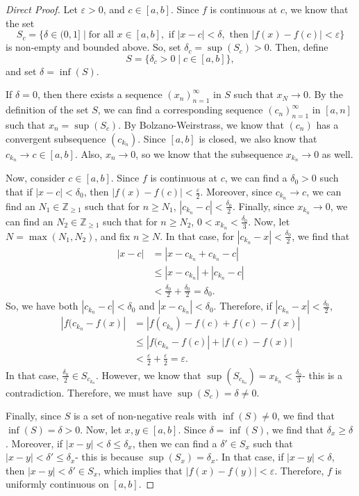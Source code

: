 \documentclass[a4paper, openany]{memoir}
\theoremstyle{definition}
\theoremstyle{plain}
\begin{document}
\begin{proof}[Direct Proof]
Let $\varepsilon > 0$, and $c \in [a, b]$. Since $f$ is continuous at $c$, we know that the set
\[S_c = \{\delta \in (0, 1] \mid \text{for all } x \in [a, b], \text{ if } |x-c| < \delta, \text{ then } |f(x) - f(c)| < \varepsilon\}\]
is non-empty and bounded above. So, set $\delta_c = \sup (S_c) > 0$. Then, define
\[S = \{\delta_c > 0 \mid c \in [a, b]\},\]
and set $\delta = \inf (S)$.

\noindent If $\delta = 0$, then there exists a sequence $(x_n)_{n=1}^{\infty}$ in $S$ such that $x_N \to 0$. By the definition of the set $S$, we can find a corresponding sequence $(c_n)_{n=1}^{\infty}$ in $[a, n]$ such that $x_n = \sup (S_c)$. By Bolzano-Weirstrass, we know that $(c_n)$ has a convergent subsequence $(c_{k_n})$. Since $[a, b]$ is closed, we also know that $c_{k_n} \to c \in [a, b]$. Also, $x_n \to 0$, so we know that the subsequence $x_{k_n} \to 0$ as well.

\noindent Now, consider $c \in [a, b]$. Since $f$ is continuous at $c$, we can find a $\delta_0 > 0$ such that if $|x - c| < \delta_0$, then $|f(x) - f(c)| < \frac{\varepsilon}{2}$. Moreover, since $c_{k_n} \to c$, we can find an $N_1 \in \mathbb{Z}_{\geqslant 1}$ such that for $n \geqslant N_1$, $|c_{k_n} - c| < \frac{\delta_0}{2}$. Finally, since $x_{k_n} \to 0$, we can find an $N_2 \in \mathbb{Z}_{\geqslant 1}$ such that for $n \geqslant N_2$, $0 < x_{k_n} < \frac{\delta_0}{3}$. Now, let $N = \max(N_1, N_2)$, and fix $n \geqslant N$. In that case, for $|c_{k_n} - x| < \frac{\delta_0}{2}$, we find that
\begin{align*}
    |x - c| &= |x - c_{k_n} + c_{k_n} - c| \\
    &\leqslant |x - c_{k_n}| + |c_{k_n} - c| \\
    &< \frac{\delta_0}{2} + \frac{\delta_0}{2} = \delta_0.
\end{align*}
So, we have both $|c_{k_n} - c| < \delta_0$ and $|x - c_{k_n}| < \delta_0$. Therefore, if $|c_{k_n} - x| < \frac{\delta_0}{2}$,
\begin{align*}
    |f(c_{k_n} - f(x)| &= |f(c_{k_n}) - f(c) + f(c) - f(x)| \\
    &\leqslant |f(c_{k_n} - f(c)| + |f(c) - f(x)| \\
    &< \frac{\varepsilon}{2} + \frac{\varepsilon}{2} = \varepsilon.
\end{align*}
In that case, $\frac{\delta_0}{2} \in S_{c_{k_n}}$. However, we know that $\sup (S_{c_{k_n}}) = x_{k_n} < \frac{\delta_0}{3}$- this is a contradiction. Therefore, we must have $\sup (S_c) = \delta \neq 0$.

\noindent Finally, since $S$ is a set of non-negative reals with $\inf (S) \neq 0$, we find that $\inf(S) = \delta > 0$. Now, let $x, y \in [a, b]$. Since $\delta = \inf (S)$, we find that $\delta_x \geqslant \delta$. Moreover, if $|x - y| < \delta \leqslant \delta_x$, then we can find a $\delta' \in S_x$ such that $|x - y| < \delta' \leqslant \delta_x$- this is because $\sup (S_x) = \delta_x$. In that case, if $|x - y| < \delta$, then $|x - y| < \delta' \in S_x$, which implies that $|f(x) - f(y)| < \varepsilon$. Therefore, $f$ is uniformly continuous on $[a, b]$.
\end{proof}
\end{document}
